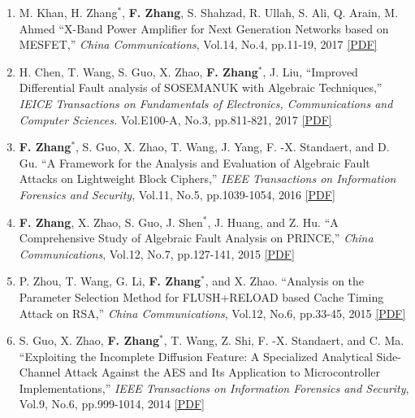 \documentclass[11pt]{article}
\begin{document}
\begin{enumerate}
\item M. Khan, H. Zhang$^\ast$, {\bf F. Zhang}, S. Shahzad, R. Ullah, S. Ali, Q. Arain, M. Ahmed ``X-Band Power Amplifier for Next Generation Networks based on MESFET,'' {\it China Communications}, Vol.14, No.4, pp.11-19, 2017 \href{http://www.isee.zju.edu.cn/fanzhang/publications/2017\_ChinaComm\_MESFET.pdf}{[PDF]}

\item H. Chen, T. Wang, S. Guo, X. Zhao, {\bf F. Zhang}$^\ast$, J. Liu, ``Improved Differential Fault analysis of SOSEMANUK with Algebraic Techniques,'' {\it IEICE Transactions on Fundamentals of Electronics, Communications and Computer Sciences.}  Vol.E100-A, No.3, pp.811-821, 2017 \href{http://www.isee.zju.edu.cn/fanzhang/publications/2017\_IEICE\_SOSEMANUK.pdf}{[PDF]}

\item {\bf F. Zhang}$^\ast$, S. Guo, X. Zhao, T. Wang, J. Yang, F. -X. Standaert, and D. Gu. ``A Framework for the Analysis and Evaluation of Algebraic Fault Attacks on Lightweight Block Ciphers,'' {\it IEEE Transactions on Information Forensics and Security}, Vol.11, No.5, pp.1039-1054, 2016 \href{http://www.isee.zju.edu.cn/fanzhang/publications/2016\_TIFS\_LBlock.pdf}{[PDF]}

\item {\bf F. Zhang}, X. Zhao, S. Guo, J. Shen$^\ast$, J. Huang, and Z. Hu. ``A Comprehensive Study of Algebraic Fault Analysis on PRINCE,'' {\it China Communications}, Vol.12, No.7, pp.127-141, 2015 \href{http://www.isee.zju.edu.cn/fanzhang/publications/2015\_ChinaComm\_PRINCE.pdf}{[PDF]}

\item P. Zhou, T. Wang, G. Li, {\bf F. Zhang}$^\ast$, and X. Zhao. ``Analysis on the Parameter Selection Method for FLUSH+RELOAD based Cache Timing Attack on RSA,'' {\it China Communications}, Vol.12, No.6, pp.33-45, 2015 \href{http://www.isee.zju.edu.cn/fanzhang/publications/2015\_ChinaComm\_flushreloadRSA.pdf}{[PDF]}

\item S. Guo, X. Zhao, {\bf F. Zhang}$^\ast$, T. Wang, Z. Shi, F. -X. Standaert, and C. Ma. ``Exploiting the Incomplete Diffusion Feature: A Specialized Analytical Side-Channel Attack Against the AES and Its Application to Microcontroller Implementations,'' {\it IEEE Transactions on Information Forensics and Security}, Vol.9, No.6, pp.999-1014, 2014 \href{http://www.isee.zju.edu.cn/fanzhang/publications/2014\_TIFS\_IDASCA.pdf}{[PDF]}


\end{enumerate}
\end{document}
